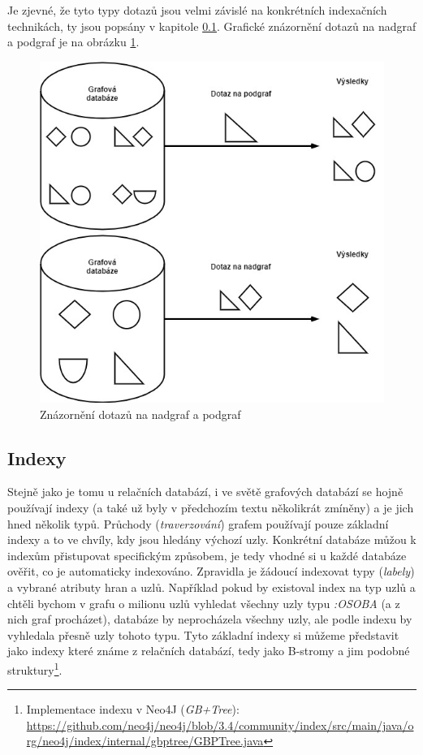 Je zjevné, že tyto typy dotazů jsou velmi závislé na konkrétních indexačních technikách, ty jsou popsány v kapitole \ref{sec:gdb-indexy}. Grafické znázornění dotazů na nadgraf a podgraf je na obrázku \ref{fig:supergraph_subgraph_query}.

\begin{figure}
\begin{center}
\includegraphics[width=14cm]{figures/supergraph_subgraph_query}
\caption{Znázornění dotazů na nadgraf a podgraf}
\label{fig:supergraph_subgraph_query}
\end{center}
\end{figure}

\subsection{Indexy}
\label{sec:gdb-indexy}
Stejně jako je tomu u relačních databází, i ve světě grafových databází se hojně používají indexy (a také už byly v předchozím textu několikrát zmíněny) a je jich hned několik typů. Průchody (\textit{traverzování}) grafem používají pouze základní indexy a to ve chvíly, kdy jsou hledány výchozí uzly. Konkrétní databáze můžou k indexům přistupovat specifickým způsobem, je tedy vhodné si u každé databáze ověřit, co je automaticky indexováno. Zpravidla je žádoucí indexovat typy (\textit{labely}) a vybrané atributy hran a uzlů. Například pokud by existoval index na typ uzlů a chtěli bychom v grafu o milionu uzlů vyhledat všechny uzly typu \textit{:OSOBA} (a z nich graf procházet), databáze by neprocházela všechny uzly, ale podle indexu by vyhledala přesně uzly tohoto typu. Tyto základní indexy si můžeme představit jako indexy které známe z relačních databází, tedy jako B-stromy a jim podobné struktury\footnote{Implementace indexu v Neo4J (\textit{GB+Tree}): \url{https://github.com/neo4j/neo4j/blob/3.4/community/index/src/main/java/org/neo4j/index/internal/gbptree/GBPTree.java}}.

